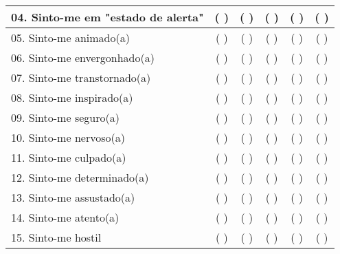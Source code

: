 \begin{table}[ht]
\begin{longtable}{|p{274pt}|l|l|l|l|l|}
\hline
04. Sinto-me em "estado de alerta" & \multicolumn{1}{c|}{(   )} & \multicolumn{1}{c|}{(   )} & \multicolumn{1}{c|}{(   )} & \multicolumn{1}{c|}{(   )} & \multicolumn{1}{c|}{(   )} \\ 
\hline
05. Sinto-me animado(a) & \multicolumn{1}{c|}{(   )} & \multicolumn{1}{c|}{(   )} & \multicolumn{1}{c|}{(   )} & \multicolumn{1}{c|}{(   )} & \multicolumn{1}{c|}{(   )} \\ 
\hline
06. Sinto-me envergonhado(a) & \multicolumn{1}{c|}{(   )} & \multicolumn{1}{c|}{(   )} & \multicolumn{1}{c|}{(   )} & \multicolumn{1}{c|}{(   )} & \multicolumn{1}{c|}{(   )} \\ 
\hline
07. Sinto-me transtornado(a) & \multicolumn{1}{c|}{(   )} & \multicolumn{1}{c|}{(   )} & \multicolumn{1}{c|}{(   )} & \multicolumn{1}{c|}{(   )} & \multicolumn{1}{c|}{(   )} \\ 
\hline
08. Sinto-me inspirado(a) & \multicolumn{1}{c|}{(   )} & \multicolumn{1}{c|}{(   )} & \multicolumn{1}{c|}{(   )} & \multicolumn{1}{c|}{(   )} & \multicolumn{1}{c|}{(   )} \\ 
\hline
09. Sinto-me seguro(a) & \multicolumn{1}{c|}{(   )} & \multicolumn{1}{c|}{(   )} & \multicolumn{1}{c|}{(   )} & \multicolumn{1}{c|}{(   )} & \multicolumn{1}{c|}{(   )} \\ 
\hline
10. Sinto-me nervoso(a) & \multicolumn{1}{c|}{(   )} & \multicolumn{1}{c|}{(   )} & \multicolumn{1}{c|}{(   )} & \multicolumn{1}{c|}{(   )} & \multicolumn{1}{c|}{(   )} \\ 
\hline
11. Sinto-me culpado(a) & \multicolumn{1}{c|}{(   )} & \multicolumn{1}{c|}{(   )} & \multicolumn{1}{c|}{(   )} & \multicolumn{1}{c|}{(   )} & \multicolumn{1}{c|}{(   )} \\ 
\hline
12. Sinto-me determinado(a) & \multicolumn{1}{c|}{(   )} & \multicolumn{1}{c|}{(   )} & \multicolumn{1}{c|}{(   )} & \multicolumn{1}{c|}{(   )} & \multicolumn{1}{c|}{(   )} \\ 
\hline
13. Sinto-me assustado(a) & \multicolumn{1}{c|}{(   )} & \multicolumn{1}{c|}{(   )} & \multicolumn{1}{c|}{(   )} & \multicolumn{1}{c|}{(   )} & \multicolumn{1}{c|}{(   )} \\ 
\hline
14. Sinto-me atento(a) & \multicolumn{1}{c|}{(   )} & \multicolumn{1}{c|}{(   )} & \multicolumn{1}{c|}{(   )} & \multicolumn{1}{c|}{(   )} & \multicolumn{1}{c|}{(   )} \\ 
\hline
15. Sinto-me hostil & \multicolumn{1}{c|}{(   )} & \multicolumn{1}{c|}{(   )} & \multicolumn{1}{c|}{(   )} & \multicolumn{1}{c|}{(   )} & \multicolumn{1}{c|}{(   )} \\ 

\end{longtable}
\end{table}
